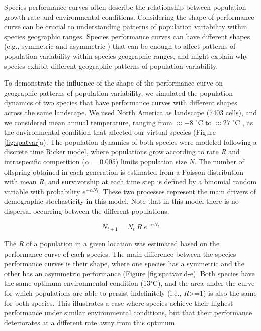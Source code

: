 \begin{tcolorbox}[breakable, enhanced, colback = white, title={Box 1}]

Species performance curves often describe the relationship between population growth rate and environmental conditions. Considering the shape of performance curve can be crucial to understanding patterns of population variability within species geographic ranges. Species performance curves can have different shapes (e.g., symmetric and asymmetric \parencite{buckley2022}) that can be enough to affect patterns of population variability within species geographic ranges, and might explain why species exhibit different geographic patterns of population variability. 

To demonstrate the influence of the shape of the performance curve on geographic patterns of population variability, we simulated the population dynamics of two species that have performance curves with different shapes across the same landscape. We used North America as landscape (7403 cells), and we considered mean annual temperature, ranging from $\approx -8$ $^{\circ}$C to $\approx 27$ $^{\circ}$C , as the environmental condition that affected our virtual species (Figure \ref{fig:spatvar}a). The population dynamics of both species were modeled following a discrete time Ricker model, where populations grow according to rate \textit{R} and intraspecific competition ($\alpha$ = 0.005) limits population size \textit{N}. The number of offspring obtained in each generation is estimated from a Poisson distribution with mean \textit{R}, and survivorship at each time step is defined by a binomial random variable with probability $e^{- \alpha N_{t}}$. These two processes represent the main drivers of demographic stochasticity in this model. Note that in this model there is no dispersal occurring between the different populations. 

\begin{equation}
\label{eq:ricker}
N_{t+1} = N_{t} \ R \ e^{- \alpha N_{t}}
\end{equation}  

The \textit{R} of a population in a given location was estimated based on the performance curve of each species. The main difference between the species performance curves is their shape, where one species has a symmetric and the other has an asymmetric performance (Figure \ref{fig:spatvar}d-e). Both species have the same optimum environmental condition (13$^{\circ}$C), and the area under the curve for which populations are able to persist indefinitely (i.e., \textit{R}>=1) is also the same for both species. This illustrates a case where species achieve their highest performance under similar environmental conditions, but that their performance deteriorates at a different rate away from this optimum.


\end{tcolorbox}
